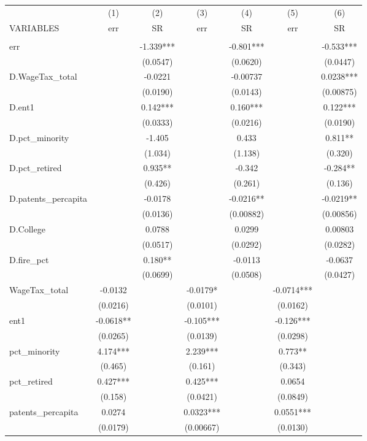 \begin{tabular}{lcccccc} \hline
 & (1) & (2) & (3) & (4) & (5) & (6) \\
VARIABLES & err & SR & err & SR & err & SR \\ \hline
 &  &  &  &  &  &  \\
err &  & -1.339*** &  & -0.801*** &  & -0.533*** \\
 &  & (0.0547) &  & (0.0620) &  & (0.0447) \\
D.WageTax\_total &  & -0.0221 &  & -0.00737 &  & 0.0238*** \\
 &  & (0.0190) &  & (0.0143) &  & (0.00875) \\
D.ent1 &  & 0.142*** &  & 0.160*** &  & 0.122*** \\
 &  & (0.0333) &  & (0.0216) &  & (0.0190) \\
D.pct\_minority &  & -1.405 &  & 0.433 &  & 0.811** \\
 &  & (1.034) &  & (1.138) &  & (0.320) \\
D.pct\_retired &  & 0.935** &  & -0.342 &  & -0.284** \\
 &  & (0.426) &  & (0.261) &  & (0.136) \\
D.patents\_percapita &  & -0.0178 &  & -0.0216** &  & -0.0219** \\
 &  & (0.0136) &  & (0.00882) &  & (0.00856) \\
D.College &  & 0.0788 &  & 0.0299 &  & 0.00803 \\
 &  & (0.0517) &  & (0.0292) &  & (0.0282) \\
D.fire\_pct &  & 0.180** &  & -0.0113 &  & -0.0637 \\
 &  & (0.0699) &  & (0.0508) &  & (0.0427) \\
WageTax\_total & -0.0132 &  & -0.0179* &  & -0.0714*** &  \\
 & (0.0216) &  & (0.0101) &  & (0.0162) &  \\
ent1 & -0.0618** &  & -0.105*** &  & -0.126*** &  \\
 & (0.0265) &  & (0.0139) &  & (0.0298) &  \\
pct\_minority & 4.174*** &  & 2.239*** &  & 0.773** &  \\
 & (0.465) &  & (0.161) &  & (0.343) &  \\
pct\_retired & 0.427*** &  & 0.425*** &  & 0.0654 &  \\
 & (0.158) &  & (0.0421) &  & (0.0849) &  \\
patents\_percapita & 0.0274 &  & 0.0323*** &  & 0.0551*** &  \\
 & (0.0179) &  & (0.00667) &  & (0.0130) &  \\

\end{tabular}
